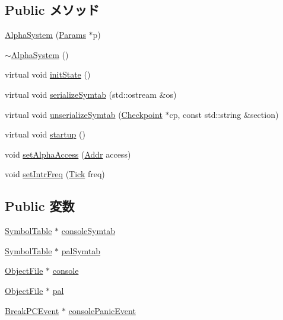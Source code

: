 \subsection*{Public メソッド}
\begin{DoxyCompactItemize}
\item 
\hyperlink{classAlphaSystem_a941905a366151e2723f8e98ffd40cadb}{AlphaSystem} (\hyperlink{classAlphaSystem_a2af24d7a564ee2ca81332fb46406cbe5}{Params} $\ast$p)
\item 
\hyperlink{classAlphaSystem_a95eeeeee39ef2bc37d8fc8ffc3b1cdbe}{$\sim$AlphaSystem} ()
\item 
virtual void \hyperlink{classAlphaSystem_a3c34ea9b29f410748d4435a667484924}{initState} ()
\item 
virtual void \hyperlink{classAlphaSystem_a4a3f2000b7188750d8fc90aa204fbfd9}{serializeSymtab} (std::ostream \&os)
\item 
virtual void \hyperlink{classAlphaSystem_a183b92b9eac0994f5d446702e995132a}{unserializeSymtab} (\hyperlink{classCheckpoint}{Checkpoint} $\ast$cp, const std::string \&section)
\item 
virtual void \hyperlink{classAlphaSystem_aecc7d8debf54990ffeaaed5bac7d7d81}{startup} ()
\item 
void \hyperlink{classAlphaSystem_a67fd461df8578f316a9be1cc3e5d70ec}{setAlphaAccess} (\hyperlink{classm5_1_1params_1_1Addr}{Addr} access)
\item 
void \hyperlink{classAlphaSystem_a5b06e992598acbcaa976da1a60396d27}{setIntrFreq} (\hyperlink{base_2types_8hh_a5c8ed81b7d238c9083e1037ba6d61643}{Tick} freq)
\end{DoxyCompactItemize}
\subsection*{Public 変数}
\begin{DoxyCompactItemize}
\item 
\hyperlink{classSymbolTable}{SymbolTable} $\ast$ \hyperlink{classAlphaSystem_a112883d2eb9b5a5c79f3717e73a15dbb}{consoleSymtab}
\item 
\hyperlink{classSymbolTable}{SymbolTable} $\ast$ \hyperlink{classAlphaSystem_a884de17d5e1c6df4f2784b07e868750e}{palSymtab}
\item 
\hyperlink{classObjectFile}{ObjectFile} $\ast$ \hyperlink{classAlphaSystem_ac1fd76adeba49aea2ab70e0cba58d9d0}{console}
\item 
\hyperlink{classObjectFile}{ObjectFile} $\ast$ \hyperlink{classAlphaSystem_a12ab7425ba24138640ac20cb79fad014}{pal}
\item 
\hyperlink{classBreakPCEvent}{BreakPCEvent} $\ast$ \hyperlink{classAlphaSystem_a0266101e4c5bb3cef386e47221ba7f83}{consolePanicEvent}
\end{DoxyCompactItemize}
